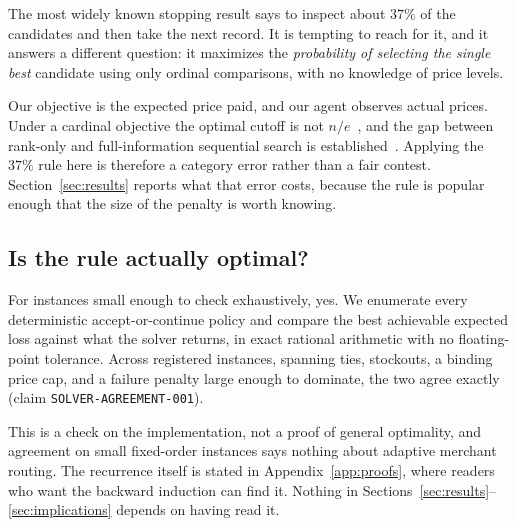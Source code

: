 The most widely known stopping result says to inspect about $37\%$ of the candidates
and then take the next record. It is tempting to reach for it, and it answers a
different question: it maximizes the \emph{probability of selecting the single best}
candidate using only ordinal comparisons, with no knowledge of price levels.

Our objective is the expected price paid, and our agent observes actual prices. Under
a cardinal objective the optimal cutoff is not $n/e$~\citep{bearden2006secretary}, and
the gap between rank-only and full-information sequential search is
established~\citep{palley2014sequential}. Applying the $37\%$ rule here is therefore a
category error rather than a fair contest. Section~\ref{sec:results} reports what that
error costs, because the rule is popular enough that the size of the penalty is worth
knowing.

\subsection{Is the rule actually optimal?}

For instances small enough to check exhaustively, yes. We enumerate every
deterministic accept-or-continue policy and compare the best achievable expected loss
against what the solver returns, in exact rational arithmetic with no floating-point
tolerance. Across \ResultSolverCasesVerified{} registered instances, spanning ties,
stockouts, a binding price cap, and a failure penalty large enough to dominate, the
two agree exactly (claim \texttt{SOLVER-AGREEMENT-001}).

This is a check on the implementation, not a proof of general optimality, and
agreement on small fixed-order instances says nothing about adaptive merchant
routing. The recurrence itself is stated in Appendix~\ref{app:proofs}, where readers
who want the backward induction can find it. Nothing in
Sections~\ref{sec:results}--\ref{sec:implications} depends on having read it.
